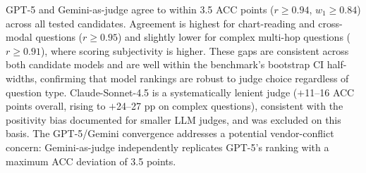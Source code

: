 \documentclass{article} %
\begin{document}
\begin{table}[htbp]
\centering
\small
\caption{Judge agreement stratified by question type on the full \textsc{SynthDocBench} (200 reports, 1{,}788 questions).
  \textbf{$r$}: Pearson correlation. \textbf{$w_1$}: within-1-point agreement. \textbf{$\Delta$ACC}: ACC(alt)~$-$~ACC(GPT-5) at $\tau{=}6$.
  Positive $\Delta$ACC means the alternative judge is more lenient than GPT-5.}
\label{tab:judge_agreement_by_type}
\end{table}

GPT-5 and Gemini-as-judge agree to within 3.5 ACC points ($r \geq 0.94$, $w_1 \geq 0.84$) across all tested candidates. Agreement is highest for chart-reading and cross-modal questions ($r \geq 0.95$) and slightly lower for complex multi-hop questions ($r \geq 0.91$), where scoring subjectivity is higher. These gaps are consistent across both candidate models and are well within the benchmark's bootstrap CI half-widths, confirming that model rankings are robust to judge choice regardless of question type. Claude-Sonnet-4.5 is a systematically lenient judge ($+$11--16 ACC points overall, rising to $+$24--27 pp on complex questions), consistent with the positivity bias documented for smaller LLM judges, and was excluded on this basis. The GPT-5/Gemini convergence addresses a potential vendor-conflict concern: Gemini-as-judge independently replicates GPT-5's ranking with a maximum ACC deviation of 3.5 points.
\end{document}
